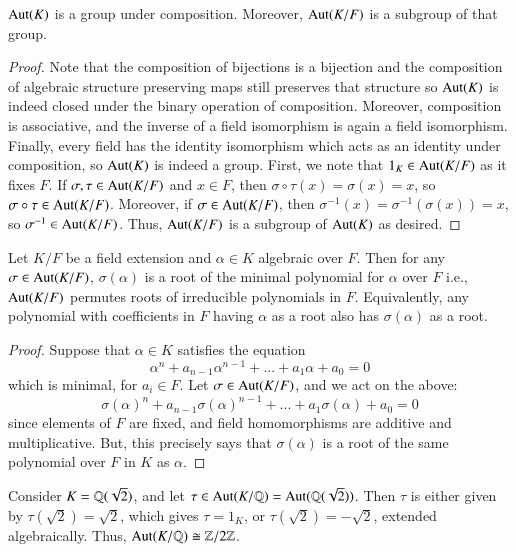 \documentclass[12pt, a4paper, oneside, openright, titlepage]{book}
\begin{document}
\begin{prop}
    $\operatorname{Aut}(K)$ is a group under composition. Moreover, $\operatorname{Aut}(K/F)$ is a subgroup of that group.
\end{prop}
\begin{proof}
    Note that the composition of bijections is a bijection and the composition of algebraic structure preserving maps still preserves that structure so $\operatorname{Aut}(K)$ is indeed closed under the binary operation of composition. Moreover, composition is associative, and the inverse of a field isomorphism is again a field isomorphism. Finally, every field has the identity isomorphism which acts as an identity under composition, so $\operatorname{Aut}(K)$ is indeed a group. First, we note that $1_K \in \operatorname{Aut}(K/F)$ as it fixes $F$. If $\sigma, \tau \in \operatorname{Aut}(K/F)$ and $x \in F$, then $\sigma\circ \tau(x) = \sigma(x) = x$, so $\sigma \circ \tau \in \operatorname{Aut}(K/F)$. Moreover, if $\sigma \in \operatorname{Aut}(K/F)$, then $\sigma^{-1}(x) = \sigma^{-1}(\sigma(x)) = x$, so $\sigma^{-1} \in \operatorname{Aut}(K/F)$. Thus, $\operatorname{Aut}(K/F)$ is a subgroup of $\operatorname{Aut}(K)$ as desired.
\end{proof}


\begin{prop}
    Let $K/F$ be a field extension and $\alpha \in K$ algebraic over $F$. Then for any $\sigma \in \operatorname{Aut}(K/F)$, $\sigma(\alpha)$ is a root of the minimal polynomial for $\alpha$ over $F$ i.e., $\operatorname{Aut}(K/F)$ permutes roots of irreducible polynomials in $F$. Equivalently, any polynomial with coefficients in $F$ having $\alpha$ as a root also has $\sigma(\alpha)$ as a root.
\end{prop}
\begin{proof}
    Suppose that $\alpha \in K$ satisfies the equation \begin{equation*}
        \alpha^n+a_{n-1}\alpha^{n-1}+...+a_1\alpha+a_0 = 0
    \end{equation*}
    which is minimal, for $a_i \in F$. Let $\sigma \in \operatorname{Aut}(K/F)$, and we act on the above: \begin{equation*}
        \sigma(\alpha)^n + a_{n-1}\sigma(\alpha)^{n-1}+...+a_1\sigma(\alpha)+a_0 = 0
    \end{equation*}
    since elements of $F$ are fixed, and field homomorphisms are additive and multiplicative. But, this precisely says that $\sigma(\alpha)$ is a root of the same polynomial over $F$ in $K$ as $\alpha$.
\end{proof}

\begin{eg}
    Consider $K = \mathbb Q(\sqrt{2})$, and let $\tau \in \operatorname{Aut}(K/\mathbb Q) = \operatorname{Aut}(\mathbb Q(\sqrt{2}))$. Then $\tau$ is either given by $\tau(\sqrt{2}) = \sqrt{2}$, which gives $\tau = 1_K$, or $\tau(\sqrt{2}) = -\sqrt{2}$, extended algebraically. Thus, $\operatorname{Aut}(K/\mathbb Q) \cong \mathbb Z/2\mathbb Z$.
\end{eg}
\end{document}
